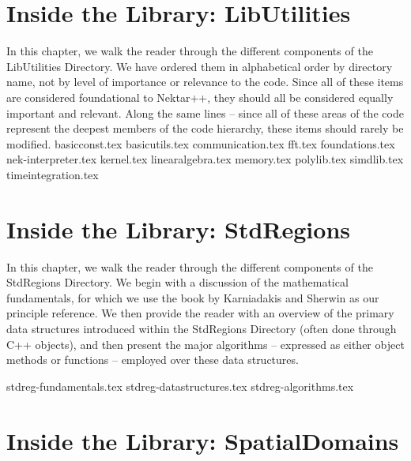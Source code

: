 
\chapter{Inside the Library: LibUtilities}

In this chapter, we walk the reader through the different components of the LibUtilities Directory.
We have ordered them in alphabetical order by directory name, not by level of importance or
relevance to the code.  Since all of these items are considered foundational to Nektar++, they
should all be considered equally important and relevant.   Along the same lines -- since all of
these areas of the code represent the deepest members of the code hierarchy, these
items should rarely be modified.
%
{basicconst.tex}
%
{basicutils.tex}
%
{communication.tex}
%
{fft.tex}
%
{foundations.tex}
%
{nek-interpreter.tex}
%
{kernel.tex}
%
{linearalgebra.tex}
%
{memory.tex}
%
{polylib.tex}
%
{simdlib.tex}
%
{timeintegration.tex}

\chapter{Inside the Library: StdRegions}
\label{chap:stdregions}

In this chapter, we walk the reader through the different components of the StdRegions Directory.
We begin with a discussion of the mathematical fundamentals, for which we use the book
by Karniadakis and Sherwin \cite{KaSh05} as our principle reference.  We then provide
the reader with an overview of the primary data structures introduced within the
StdRegions Directory (often done through C++ objects), and then present the major
algorithms -- expressed as either object methods or functions -- employed over these data structures.


{stdreg-fundamentals.tex}
%
{stdreg-datastructures.tex}
%
{stdreg-algorithms.tex}


\chapter{Inside the Library: SpatialDomains}
\label{chap:spatialdomains}



